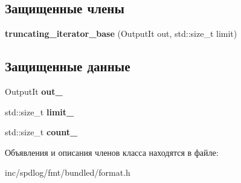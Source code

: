\subsection*{Защищенные члены}
\begin{DoxyCompactItemize}
\item 
\mbox{\label{classinternal_1_1truncating__iterator__base_a2258c919b872d848184e9fc1b7dbdf3a}} 
{\bfseries truncating\+\_\+iterator\+\_\+base} (Output\+It out, std\+::size\+\_\+t limit)
\end{DoxyCompactItemize}
\subsection*{Защищенные данные}
\begin{DoxyCompactItemize}
\item 
\mbox{\label{classinternal_1_1truncating__iterator__base_ad71c2995e490bc04f31c7981a1b84e42}} 
Output\+It {\bfseries out\+\_\+}
\item 
\mbox{\label{classinternal_1_1truncating__iterator__base_ad244bae44f3628e1bd8f78584e404649}} 
std\+::size\+\_\+t {\bfseries limit\+\_\+}
\item 
\mbox{\label{classinternal_1_1truncating__iterator__base_acd98513e96d00a0d34164ad91533bbf7}} 
std\+::size\+\_\+t {\bfseries count\+\_\+}
\end{DoxyCompactItemize}


Объявления и описания членов класса находятся в файле\+:\begin{DoxyCompactItemize}
\item 
inc/spdlog/fmt/bundled/format.\+h\end{DoxyCompactItemize}
